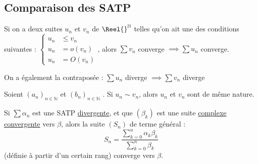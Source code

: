 \documentclass[11pt,a4paper,fleqn,pdftex]{report}
\begin{document}
\subsection{Comparaison des \gls{SATP}} %
\label{sub:comparaison_des_satp}
\begin{itheorem}
    Si on a deux suites $u_n$ et $v_n$ de $\Reel{}^\mathbb{N}$ telles qu'on ait une des conditions suivantes : $
    \left\lbrace
    \begin{aligned}
        u_n &\le v_n    \\
        u_n &= o(v_n)   \\
        u_n &= O(v_n)
    \end{aligned}
    \right. $, alors $\sum v_n$ converge $\implies \sum u_n$ converge. \par

    On a également la contraposée : 
    $\sum u_n$ diverge $\implies \sum v_n$ diverge
\end{itheorem}
\begin{itheorem}
     Soient $(a_n)_{n\in \mathbb{N}}$ et $(b_n)_{n\in \mathbb{N}}$ . \newline
     Si $u_n \sim v_n$, alors $u_n$ et $v_n$ sont de même nature.
\end{itheorem}
\begin{theorem}
    Si $\sum \alpha_n$ est une \gls{SATP} \uline{divergente}, et que $(\beta_k)$ est une suite \uline{complexe convergente} vers $\beta$, alors la suite $(S_n)$ de terme général : 
    \[
        S_n = \dfrac{\displaystyle \sum_{k=0}^n \alpha_k \beta_k}{\displaystyle \sum_{k=0}^n \beta_k}
    \]
    (définie à partir d'un certain rang) converge vers $\beta$.
\end{theorem}
\end{document}
